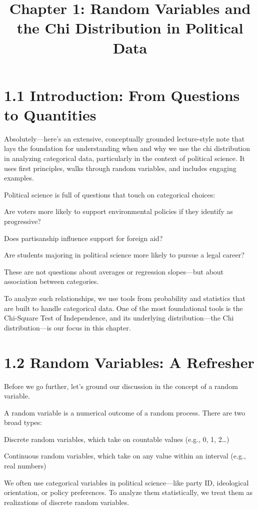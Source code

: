 \documentclass[12pt]{article}
\title{Chapter 1: Random Variables and the Chi Distribution in Political Data}
\date{}
\begin{document}
\maketitle

\section*{1.1 Introduction: From Questions to Quantities}

Absolutely—here’s an extensive, conceptually grounded lecture-style note that lays the foundation for understanding when and why we use the chi distribution in analyzing categorical data, particularly in the context of political science. It uses first principles, walks through random variables, and includes engaging examples.

Political science is full of questions that touch on categorical choices:

Are voters more likely to support environmental policies if they identify as progressive?

Does partisanship influence support for foreign aid?

Are students majoring in political science more likely to pursue a legal career?

These are not questions about averages or regression slopes—but about association between categories.

To analyze such relationships, we use tools from probability and statistics that are built to handle categorical data. One of the most foundational tools is the Chi-Square Test of Independence, and its underlying distribution—the Chi distribution—is our focus in this chapter.

\section*{1.2 Random Variables: A Refresher}

Before we go further, let’s ground our discussion in the concept of a random variable.

A random variable is a numerical outcome of a random process. There are two broad types:

Discrete random variables, which take on countable values (e.g., 0, 1, 2…)

Continuous random variables, which take on any value within an interval (e.g., real numbers)

We often use categorical variables in political science—like party ID, ideological orientation, or policy preferences. To analyze them statistically, we treat them as realizations of discrete random variables.
\end{document}
